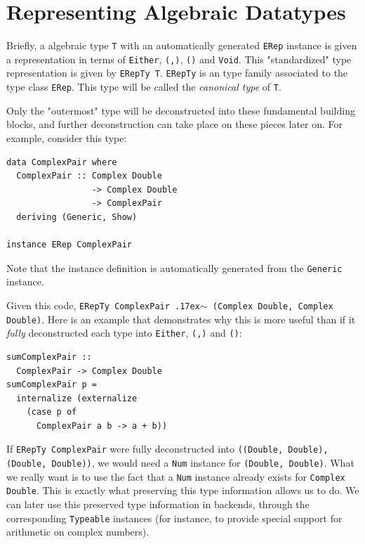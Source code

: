 \documentclass[sigplan,anonymous,review]{acmart}
\newcommand{\typeeq}{\raise.17ex\hbox{$\scriptstyle\mathtt{\sim}$}\,\;}
\newcommand{\ttt}{\texttt}
\newcommand{\showtodos}{}  %
\newenvironment{todo}
  {\ifthenelse{\isundefined{\showtodos}}{\comment}{\begin{tcolorbox}
    \textbf{TODO}:}}
  {\ifthenelse{\isundefined{\showtodos}}{\endcomment}{\end{tcolorbox}}
  }
\begin{document}
\section{Representing Algebraic Datatypes}
\label{sec:ADTRep}


Briefly, a algebraic type \ttt{T} with an automatically generated \ttt{ERep}
instance is given a representation in terms of \ttt{Either}, \ttt{(,)}, \ttt{()}
and \ttt{Void}.  This "standardized" type representation is given by \ttt{ERepTy
T}. \ttt{ERepTy} is an type family associated to the type class \ttt{ERep}. This
type will be called the \textit{canonical type} of \ttt{T}.

Only the "outermost" type will be deconstructed into these fundamental building
blocks, and further deconstruction can take place on these pieces later on. For
example, consider this type:

\begin{lstlisting}
data ComplexPair where
  ComplexPair :: Complex Double
                 -> Complex Double
                 -> ComplexPair
  deriving (Generic, Show)

instance ERep ComplexPair
\end{lstlisting}

Note that the instance definition is automatically generated from the
\ttt{Generic} instance.

Given this code, \ttt{ERepTy ComplexPair \typeeq (Complex Double, Complex Double)}. Here
is an example that demonstrates why this is more useful than if it \textit{fully} deconstructed
each type into \ttt{Either}, \ttt{(,)} and \ttt{()}:

\begin{lstlisting}
sumComplexPair ::
  ComplexPair -> Complex Double
sumComplexPair p =
  internalize (externalize
    (case p of
      ComplexPair a b -> a + b))
\end{lstlisting}

If \ttt{ERepTy ComplexPair} were fully deconstructed into \ttt{((Double, Double),
(Double, Double))}, we would need a \ttt{Num} instance for \ttt{(Double,
Double)}.  What we really want is to use the fact that a \ttt{Num} instance
already exists for \ttt{Complex Double}. This is exactly what preserving this
type information allows us to do. We can later use this preserved type
information in backends, through the corresponding \ttt{Typeable} instances (for
instance, to provide special support for arithmetic on complex numbers).
\end{document}
